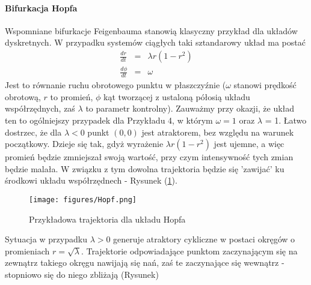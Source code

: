\documentclass[12pt]{article}
\begin{document}
\paragraph{Bifurkacja Hopfa}
Wspomniane bifurkacje Feigenbauma stanowią klasyczny przykład dla układów dyskretnych. W przypadku systemów ciągłych taki sztandarowy układ ma postać
\begin{equation}
\begin{array}{rcl} 
\frac{dr}{dt} & = & \lambda r(1-r^2) \\ 
\frac{d\phi}{dt} & = & \omega
\end{array}
\end{equation}
Jest to równanie ruchu obrotowego punktu w płaszczyźnie ($ \omega $ stanowi prędkość obrotową, $ r $ to promień, $ \phi $ kąt tworzącej z ustaloną półosią układu współrzędnych, zaś $ \lambda  $ to parametr kontrolny). Zauważmy przy okazji, że układ ten to ogólniejszy przypadek dla Przykładu 4, w którym $ \omega = 1 $ oraz $ \lambda $ = 1.\newline
Łatwo dostrzec, że dla $ \lambda < 0 $ punkt $ (0,0) $ jest atraktorem, bez względu na warunek początkowy. Dzieje się tak, gdyż wyrażenie $ \lambda r(1-r^{2}) $ jest ujemne, a więc promień będzie zmniejszał swoją wartość, przy czym intensywność tych zmian będzie malała. W związku z tym dowolna trajektoria będzie się 'zawijać' ku środkowi układu współrzędnech - Rysunek (\ref{Fig9}).
\begin{figure}[H]
	\texttt{[image: figures/Hopf.png]} 
	\centering
	\caption{Przykładowa trajektoria dla układu Hopfa}
	\label{Fig9}
\end{figure}
Sytuacja w przypadku $ \lambda >0 $ generuje atraktory cykliczne w postaci okręgów o promieniach $ r = \sqrt{\lambda} $. Trajektorie odpowiadające punktom zaczynającym się na zewnątrz takiego okręgu nawijają się nań, zaś te zaczynające się wewnątrz - stopniowo się do niego zbliżają (Rysunek)
\end{document}
